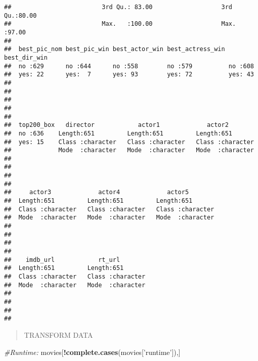 \documentclass[]{article}
\newenvironment{Shaded}{\begin{snugshade}}{\end{snugshade}}
\newcommand{\KeywordTok}[1]{\textcolor[rgb]{0.13,0.29,0.53}{\textbf{#1}}}
\newcommand{\StringTok}[1]{\textcolor[rgb]{0.31,0.60,0.02}{#1}}
\newcommand{\CommentTok}[1]{\textcolor[rgb]{0.56,0.35,0.01}{\textit{#1}}}
\newcommand{\OperatorTok}[1]{\textcolor[rgb]{0.81,0.36,0.00}{\textbf{#1}}}
\newcommand{\NormalTok}[1]{#1}
\begin{document}
\begin{verbatim}
##                         3rd Qu.: 83.00                   3rd Qu.:80.00  
##                         Max.   :100.00                   Max.   :97.00  
##                                                                         
##  best_pic_nom best_pic_win best_actor_win best_actress_win best_dir_win
##  no :629      no :644      no :558        no :579          no :608     
##  yes: 22      yes:  7      yes: 93        yes: 72          yes: 43     
##                                                                        
##                                                                        
##                                                                        
##                                                                        
##                                                                        
##  top200_box   director            actor1             actor2         
##  no :636    Length:651         Length:651         Length:651        
##  yes: 15    Class :character   Class :character   Class :character  
##             Mode  :character   Mode  :character   Mode  :character  
##                                                                     
##                                                                     
##                                                                     
##                                                                     
##     actor3             actor4             actor5         
##  Length:651         Length:651         Length:651        
##  Class :character   Class :character   Class :character  
##  Mode  :character   Mode  :character   Mode  :character  
##                                                          
##                                                          
##                                                          
##                                                          
##    imdb_url            rt_url         
##  Length:651         Length:651        
##  Class :character   Class :character  
##  Mode  :character   Mode  :character  
##                                       
##                                       
##                                       
## 
\end{verbatim}

\begin{quote}
TRANSFORM DATA
\end{quote}

\begin{Shaded}
\begin{Highlighting}[]
\CommentTok{#Runtime:}
\NormalTok{movies[}\OperatorTok{!}\KeywordTok{complete.cases}\NormalTok{(movies[}\StringTok{'runtime'}\NormalTok{]),]}
\end{Highlighting}
\end{Shaded}
\end{document}
